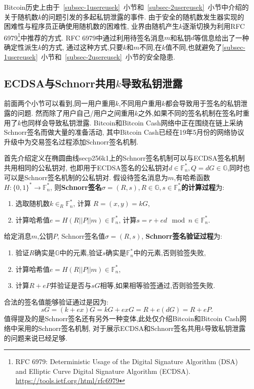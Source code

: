 \documentclass{article}
\renewcommand{\G}{\mathbb{G}}
\newcommand{\F}{\mathbb{F}}
\begin{document}
Bitcoin历史上由于~\ref{subsec-1usereusek}~小节和~\ref{subsec-2usereusek}~小节中介绍的
关于随机数$k$的问题引发的多起私钥泄露的事件. 
由于安全的随机数发生器实现的困难性与程序员正确使用随机数的困难性,
业界由随机产生$k$逐渐切换为利用RFC 6979\footnote{
RFC 6979: Deterministic Usage of the Digital Signature Algorithm (DSA) and Elliptic Curve Digital Signature Algorithm (ECDSA).
\url{https://tools.ietf.org/html/rfc6979}}中推荐的方式.
RFC 6979中通过利用待签名消息$m$和私钥$d$等信息给出了一种确定性派生$k$的方式,
通过这种方式,只要$k$和$m$不同,在$k$值不同,也就避免了\ref{subsec-1usereusek}~小节和~\ref{subsec-2usereusek}~小节的安全隐患.

\subsection{ECDSA与Schnorr共用$k$导致私钥泄露\label{subsec-ecdsaschnorr}}

前面两个小节可以看到,同一用户重用$k$,不同用户重用$k$都会导致用于签名的私钥泄露的问题.
然而除了用户自己/用户之间重用$k$之外,如果不同的签名机制在签名时重用了$k$也同样会导致私钥泄露.
Bitcoin和Bitcoin Cash网络中正在围绕在链上采纳Schnorr签名而做大量的准备活动,
其中Bitcoin Cash已经在19年5月份的网络协议升级中为交易签名过程添加Schnorr签名机制.

首先介绍定义在椭圆曲线secp256k1上的Schnorr签名机制可以与ECDSA签名机制共用相同的公私钥对,
也即用于ECDSA签名的公私钥对$d\in\F_n^*, Q=dG\in\G$,同时也可以是Schnorr签名机制的公私钥对.
假设待签名消息为$m$,有哈希函数$H: \{0,1\}^*\rightarrow \F_n^*$, 
则\textbf{Schnorr签名$\sigma=(R,s), R\in \G, s\in\F_n^*$的计算过程}为:
\begin{enumerate}
\item 选取随机数$k\in_R\F_n^*$, 计算 $R=(x,y)=kG$,
\item 计算哈希值$e = H(R||P||m)\in\F_n^*$, 计算$s=r+ed \mod n \in \F_n^*$.
\end{enumerate}
给定消息$m$,公钥$P$, Schnorr签名值$\sigma=(R,s)$, \textbf{Schnorr签名验证过程}为:
\begin{enumerate}
\item 验证$R$确实是$\G$中的元素,验证$s$确实是$\F_n^*$中的元素,否则验签失败,
\item 计算哈希值$e = H(R||P||m)\in\F_n^*$,
\item 计算$R+eP$并验证是否与$sG$相等,如果相等验签通过,否则验签失败.
\end{enumerate}
合法的签名值能够验证通过是因为:
$$
sG = (k+ex)G = kG + exG = R + e(dG) = R + eP.
$$
值得提及的是Schnorr签名还有另外一种变体,此处仅介绍Bitcoin和Bitcoin Cash网络中采用的Schnorr签名机制,
对于展示ECDSA和Schnorr签名共用$k$导致私钥泄露的问题来说已经足够.
\end{document}
